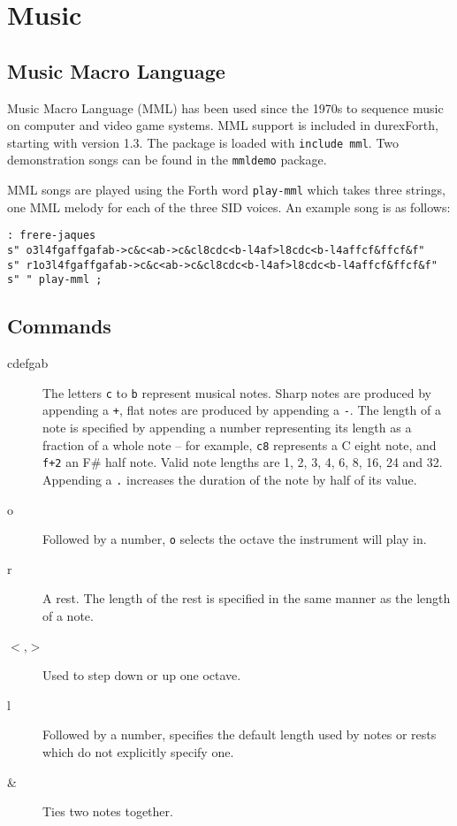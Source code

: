 \chapter{Music}

\section{Music Macro Language}

Music Macro Language (MML) has been used since the 1970s to sequence music on computer and video game systems. MML support is included in durexForth, starting with version 1.3. The package is loaded with \texttt{include mml}. Two demonstration songs can be found in the \texttt{mmldemo} package.

MML songs are played using the Forth word \texttt{play-mml} which takes three strings, one MML melody for each of the three SID voices. An example song is as follows:

\begin{verbatim}
: frere-jaques
s" o3l4fgaffgafab->c&c<ab->c&cl8cdc<b-l4af>l8cdc<b-l4affcf&ffcf&f"
s" r1o3l4fgaffgafab->c&c<ab->c&cl8cdc<b-l4af>l8cdc<b-l4affcf&ffcf&f"
s" " play-mml ;
\end{verbatim}

\section{Commands}

\begin{description}
\item[cdefgab] The letters \texttt{c} to \texttt{b} represent musical notes. Sharp notes are produced by appending a \texttt{+}, flat notes are produced by appending a \texttt{-}. The length of a note is specified by appending a number representing its length as a fraction of a whole note -- for example, \texttt{c8} represents a C eight note, and \texttt{f+2} an F\# half note. Valid note lengths are 1, 2, 3, 4, 6, 8, 16, 24 and 32. Appending a \texttt{.} increases the duration of the note by half of its value.
\item[o] Followed by a number, \texttt{o} selects the octave the instrument will play in.
\item[r] A rest. The length of the rest is specified in the same manner as the length of a note.
\item[$<$,$>$] Used to step down or up one octave.
\item[l] Followed by a number, specifies the default length used by notes or rests which do not explicitly specify one.
\item[\&] Ties two notes together.
\end{description}
